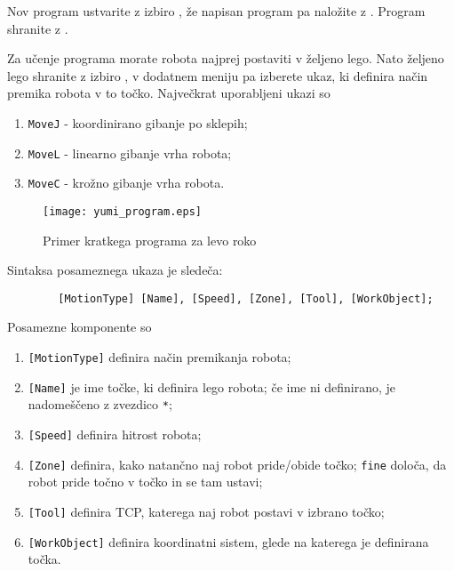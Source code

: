 Nov program ustvarite z izbiro , že napisan program pa naložite z . Program shranite z .


Za učenje programa morate robota najprej postaviti v željeno lego. Nato željeno lego shranite z izbiro , v dodatnem meniju pa izberete ukaz, ki definira način premika robota v to točko. Največkrat uporabljeni ukazi so
\begin{enumerate}
	\item \verb"MoveJ" - koordinirano gibanje po sklepih;
	\item \verb"MoveL" - linearno gibanje vrha robota;
	\item \verb"MoveC" - krožno gibanje vrha robota.
\end{enumerate}

\begin{figure}[!tbh]
	\centering
	\texttt{[image: yumi\_program.eps]}
	\caption{Primer kratkega programa za levo roko}
	\label{fig:yumi_program_L}
\end{figure}

Sintaksa posameznega ukaza je sledeča:
{\small
	\begin{verbatim}
		[MotionType] [Name], [Speed], [Zone], [Tool], [WorkObject];
	\end{verbatim}
}
Posamezne komponente so
\begin{enumerate}
	\item \verb"[MotionType]" definira način premikanja robota;
	\item \verb"[Name]" je ime točke, ki definira lego robota; če ime ni definirano, je nadomeščeno z zvezdico \verb"*";
	\item \verb"[Speed]" definira hitrost robota;
	\item \verb"[Zone]" definira, kako natančno naj robot pride/obide točko; \verb"fine" določa, da robot pride točno v točko in se tam ustavi;
	\item \verb"[Tool]" definira TCP, katerega naj robot postavi v izbrano točko;
	\item \verb"[WorkObject]" definira koordinatni sistem, glede na katerega je definirana točka.
\end{enumerate}

